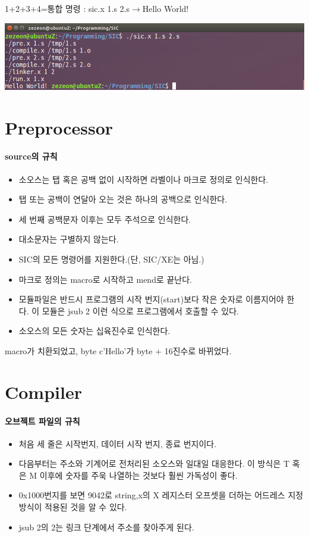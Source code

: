 \documentclass[12pt,a4paper]{report}
\begin{document}
1+2+3+4=통합 명령 : sic.x 1.s 2.s$\longrightarrow$Hello World!

\includegraphics[width=\textwidth]{hello.png}
\section{Preprocessor}
\paragraph{source의 규칙}
\begin{itemize}
\item 소오스는 탭 혹은 공백 없이 시작하면 라벨이나 마크로 정의로 인식한다.
\item 탭 또는 공백이 연달아 오는 것은 하나의 공백으로 인식한다.
\item 세 번째 공백문자 이후는 모두 주석으로 인식한다. 
\item 대소문자는 구별하지 않는다.
\item SIC의 모든 명령어를 지원한다.(단, SIC/XE는 아님.)
\item 마크로 정의는 macro로 시작하고 mend로 끝난다.
\item 모듈파일은 반드시 프로그램의 시작 번지(start)보다 작은 숫자로 이름지어야 한다. 이 모듈은 jsub 2 이런 식으로 프로그램에서 호출할 수 있다.
\item 소오스의 모든 숫자는 십육진수로 인식한다.
\end{itemize}

macro가 치환되었고, byte c'Hello'가 byte + 16진수로 바뀌었다.

\section{Compiler}

\paragraph{오브젝트 파일의 규칙}
\begin{itemize}
	\item 처음 세 줄은 시작번지, 데이터 시작 번지, 종료 번지이다.
	\item 다음부터는 주소와 기계어로 전처리된 소오스와 일대일 대응한다. 이 방식은 T 혹은 M 이후에 숫자를 주욱 나열하는 것보다 훨씬 가독성이 좋다.
	\item 0x1000번지를 보면 9042로 string,x의 X 레지스터 오프셋을 더하는 어드레스 지정방식이 적용된 것을 알 수 있다.
	\item jsub 2의 2는 링크 단계에서 주소를 찾아주게 된다.
\end{itemize}
\end{document}
